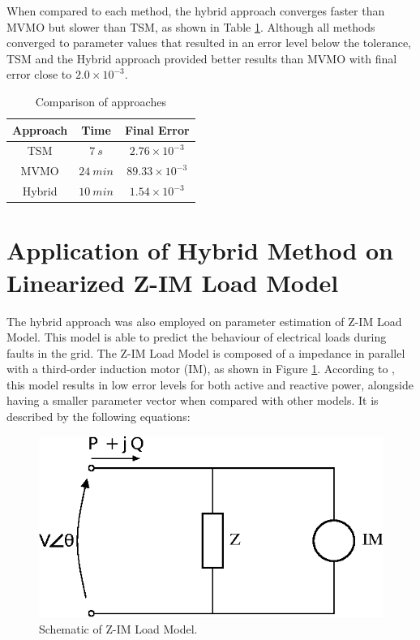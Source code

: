 When compared to each method, the hybrid approach converges faster than MVMO but slower than TSM, as shown in Table \ref{tab: SM}. Although all methods converged to parameter values that resulted in an error level below the tolerance, TSM and the Hybrid approach provided better results than MVMO with final error close to $2.0\times 10^{-3}$.

\begin{table}[h]
	\caption{Comparison of approaches}
	\begin{center}
	\begin{tabular}{c|c|c}
		Approach & Time & Final Error \\
		\hline
		TSM  & $7 \ s$  & $2.76\times 10^{-3}$ \\
		MVMO  & $24 \ min$  & $89.33\times 10^{-3}$\\
		Hybrid  & $10 \ min$  & $1.54\times 10^{-3}$
	\end{tabular}
	\end{center}
	\label{tab: SM}
\end{table}

\section{Application of Hybrid Method on Linearized Z-IM Load Model}

The hybrid approach was also employed on parameter estimation of Z-IM Load Model. This model is able to predict the behaviour of electrical loads during faults in the grid. The Z-IM Load Model is composed of a impedance in parallel with a third-order induction motor (IM), as shown in Figure \ref{img: Z-IM}. According to \cite{Choi}, this model results in low error levels for both active and reactive power, alongside having a smaller parameter vector when compared with other models. It is described by the following equations:

\begin{figure}[h]
    \caption{Schematic of Z-IM Load Model.}
    \begin{center}
    	\includegraphics[scale=1]{Images/drawZIM.eps}
    \end{center}
    \label{img: Z-IM}
\end{figure}

